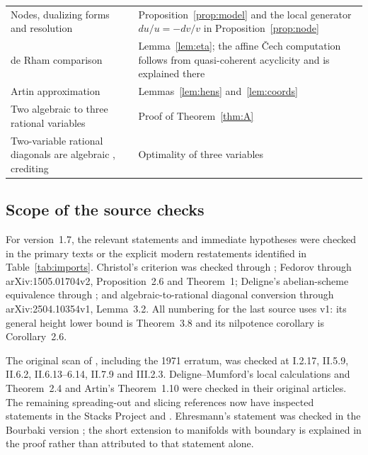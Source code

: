 \documentclass[11pt]{amsart}
\theoremstyle{definition}
\theoremstyle{remark}
\numberwithin{equation}{section}
\begin{document}
\begin{longtable}{>{\raggedright\arraybackslash}p{}>{\raggedright\arraybackslash}p{}}
Nodes, dualizing forms and resolution \citep[\S1, pp.~76--77, 84--85]{DeligneMumford1969} & Proposition~\ref{prop:model} and the local generator $du/u=-dv/v$ in Proposition~\ref{prop:node}\\
de Rham comparison \citep[II.6.2]{Deligne1970} & Lemma~\ref{lem:eta}; the affine Čech computation follows from quasi-coherent acyclicity and is explained there\\
Artin approximation \citep[Theorem~1.10]{Artin1969} & Lemmas~\ref{lem:hens} and~\ref{lem:coords}\\
Two algebraic to three rational variables \citep[Lemma~3.2, v1]{HarderKramerMiller2025} & Proof of Theorem~\ref{thm:A}\\
Two-variable rational diagonals are algebraic \citep[Section~1]{HarderKramerMiller2025}, crediting \citep{Polya1922,Furstenberg1967} & Optimality of three variables\\
\end{longtable}
\normalsize

\subsection*{Scope of the source checks}
For version~1.7, the relevant statements and immediate hypotheses were checked in the primary texts or the explicit modern restatements identified in Table~\ref{tab:imports}. Christol's criterion was checked through \citet[Theorem~2.3, arXiv:2308.12855v3]{FurnsinnYurkevich2024}; Fedorov through arXiv:1505.01704v2, Proposition~2.6 and Theorem~1; Deligne's abelian-scheme equivalence through \citet[Theorem~7.13, arXiv:1105.0887v1]{Milne2013}; and algebraic-to-rational diagonal conversion through arXiv:2504.10354v1, Lemma~3.2. All numbering for the last source uses v1: its general height lower bound is Theorem~3.8 and its nilpotence corollary is Corollary~2.6.

The original scan of \citet{Deligne1970}, including the 1971 erratum, was checked at I.2.17, II.5.9, II.6.2, II.6.13--6.14, II.7.9 and III.2.3. Deligne--Mumford's local calculations and Theorem~2.4 and Artin's Theorem~1.10 were checked in their original articles. The remaining spreading-out and slicing references now have inspected statements in the Stacks Project and \citet{Catanese2015}. Ehresmann's statement was checked in the Bourbaki version \citep{Ehresmann1952}; the short extension to manifolds with boundary is explained in the proof rather than attributed to that statement alone.
\end{document}
